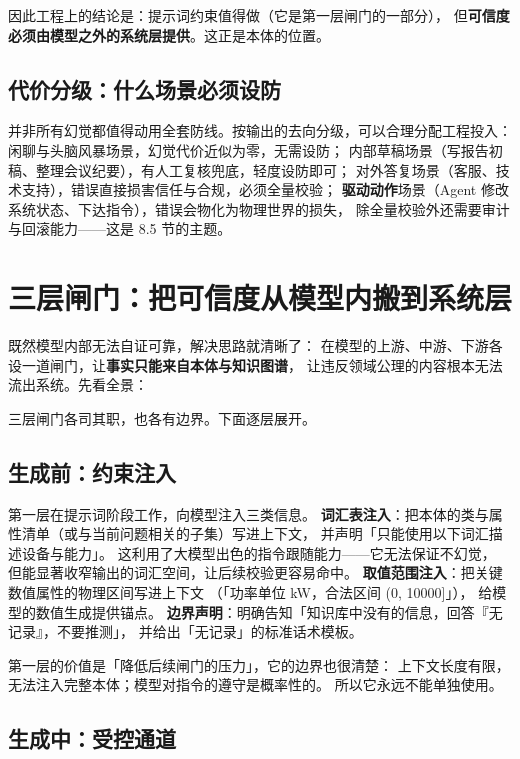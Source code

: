 因此工程上的结论是：提示词约束值得做（它是第一层闸门的一部分），
但\textbf{可信度必须由模型之外的系统层提供}。这正是本体的位置。

\subsection{代价分级：什么场景必须设防}

并非所有幻觉都值得动用全套防线。按输出的去向分级，可以合理分配工程投入：
闲聊与头脑风暴场景，幻觉代价近似为零，无需设防；
内部草稿场景（写报告初稿、整理会议纪要），有人工复核兜底，轻度设防即可；
对外答复场景（客服、技术支持），错误直接损害信任与合规，必须全量校验；
\textbf{驱动动作}场景（Agent 修改系统状态、下达指令），错误会物化为物理世界的损失，
除全量校验外还需要审计与回滚能力——这是 8.5 节的主题。

\section{三层闸门：把可信度从模型内搬到系统层}

既然模型内部无法自证可靠，解决思路就清晰了：
在模型的上游、中游、下游各设一道闸门，让\textbf{事实只能来自本体与知识图谱}，
让违反领域公理的内容根本无法流出系统。先看全景：



三层闸门各司其职，也各有边界。下面逐层展开。

\subsection{生成前：约束注入}

第一层在提示词阶段工作，向模型注入三类信息。
\textbf{词汇表注入}：把本体的类与属性清单（或与当前问题相关的子集）写进上下文，
并声明「只能使用以下词汇描述设备与能力」。
这利用了大模型出色的指令跟随能力——它无法保证不幻觉，
但能显著收窄输出的词汇空间，让后续校验更容易命中。
\textbf{取值范围注入}：把关键数值属性的物理区间写进上下文
（「功率单位 kW，合法区间 (0, 10000]」），
给模型的数值生成提供锚点。
\textbf{边界声明}：明确告知「知识库中没有的信息，回答『无记录』，不要推测」，
并给出「无记录」的标准话术模板。

第一层的价值是「降低后续闸门的压力」，它的边界也很清楚：
上下文长度有限，无法注入完整本体；模型对指令的遵守是概率性的。
所以它永远不能单独使用。

\subsection{生成中：受控通道}

